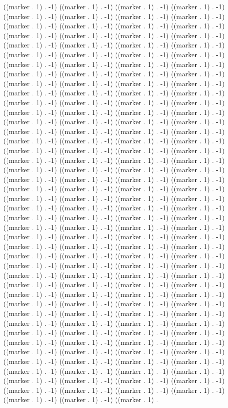 ((marker . 1) . -1) ((marker . 1) . -1) ((marker . 1) . -1) ((marker . 1) . -1) ((marker . 1) . -1) ((marker . 1) . -1) ((marker . 1) . -1) ((marker . 1) . -1) ((marker . 1) . -1) ((marker . 1) . -1) ((marker . 1) . -1) ((marker . 1) . -1) ((marker . 1) . -1) ((marker . 1) . -1) ((marker . 1) . -1) ((marker . 1) . -1) ((marker . 1) . -1) ((marker . 1) . -1) ((marker . 1) . -1) ((marker . 1) . -1) ((marker . 1) . -1) ((marker . 1) . -1) ((marker . 1) . -1) ((marker . 1) . -1) ((marker . 1) . -1) ((marker . 1) . -1) ((marker . 1) . -1) ((marker . 1) . -1) ((marker . 1) . -1) ((marker . 1) . -1) ((marker . 1) . -1) ((marker . 1) . -1) ((marker . 1) . -1) ((marker . 1) . -1) ((marker . 1) . -1) ((marker . 1) . -1) ((marker . 1) . -1) ((marker . 1) . -1) ((marker . 1) . -1) ((marker . 1) . -1) ((marker . 1) . -1) ((marker . 1) . -1) ((marker . 1) . -1) ((marker . 1) . -1) ((marker . 1) . -1) ((marker . 1) . -1) ((marker . 1) . -1) ((marker . 1) . -1) ((marker . 1) . -1) ((marker . 1) . -1) ((marker . 1) . -1) ((marker . 1) . -1) ((marker . 1) . -1) ((marker . 1) . -1) ((marker . 1) . -1) ((marker . 1) . -1) ((marker . 1) . -1) ((marker . 1) . -1) ((marker . 1) . -1) ((marker . 1) . -1) ((marker . 1) . -1) ((marker . 1) . -1) ((marker . 1) . -1) ((marker . 1) . -1) ((marker . 1) . -1) ((marker . 1) . -1) ((marker . 1) . -1) ((marker . 1) . -1) ((marker . 1) . -1) ((marker . 1) . -1) ((marker . 1) . -1) ((marker . 1) . -1) ((marker . 1) . -1) ((marker . 1) . -1) ((marker . 1) . -1) ((marker . 1) . -1) ((marker . 1) . -1) ((marker . 1) . -1) ((marker . 1) . -1) ((marker . 1) . -1) ((marker . 1) . -1) ((marker . 1) . -1) ((marker . 1) . -1) ((marker . 1) . -1) ((marker . 1) . -1) ((marker . 1) . -1) ((marker . 1) . -1) ((marker . 1) . -1) ((marker . 1) . -1) ((marker . 1) . -1) ((marker . 1) . -1) ((marker . 1) . -1) ((marker . 1) . -1) ((marker . 1) . -1) ((marker . 1) . -1) ((marker . 1) . -1) ((marker . 1) . -1) ((marker . 1) . -1) ((marker . 1) . -1) ((marker . 1) . -1) ((marker . 1) . -1) ((marker . 1) . -1) ((marker . 1) . -1) ((marker . 1) . -1) ((marker . 1) . -1) ((marker . 1) . -1) ((marker . 1) . -1) ((marker . 1) . -1) ((marker . 1) . -1) ((marker . 1) . -1) ((marker . 1) . -1) ((marker . 1) . -1) ((marker . 1) . -1) ((marker . 1) . -1) ((marker . 1) . -1) ((marker . 1) . -1) ((marker . 1) . -1) ((marker . 1) . -1) ((marker . 1) . -1) ((marker . 1) . -1) ((marker . 1) . -1) ((marker . 1) . -1) ((marker . 1) . -1) ((marker . 1) . -1) ((marker . 1) . -1) ((marker . 1) . -1) ((marker . 1) . -1) ((marker . 1) . -1) ((marker . 1) . -1) ((marker . 1) . -1) ((marker . 1) . -1) ((marker . 1) . -1) ((marker . 1) . -1) ((marker . 1) . -1) ((marker . 1) . -1) ((marker . 1) . -1) ((marker . 1) . -1) ((marker . 1) . -1) ((marker . 1) . -1) ((marker . 1) . -1) ((marker . 1) . -1) ((marker . 1) . -1) ((marker . 1) . -1) ((marker . 1) . -1) ((marker . 1) . -1) ((marker . 1) . -1) ((marker . 1) . -1) ((marker . 1) . -1) ((marker . 1) . -1) ((marker . 1) . -1) ((marker . 1) . -1) ((marker . 1) . -1) ((marker . 1) . -1) ((marker . 1) . -1) ((marker . 1) . -1) ((marker . 1) . -1) ((marker . 1) . -1) ((marker . 1) . -1) ((marker . 1) . -1) ((marker . 1) . -1) ((marker . 1) . -1) ((marker . 1) . -1) ((marker . 1) . -1) ((marker . 1) . -1) ((marker . 1) . -1) ((marker . 1) . -1) ((marker . 1) . 
